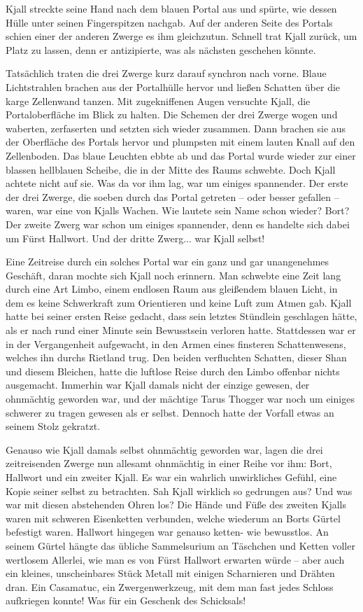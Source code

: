 \documentclass[10pt, a4paper, oneside]{book}
\begin{document}
Kjall streckte seine Hand nach dem blauen Portal aus und spürte, wie dessen Hülle unter seinen Fingerspitzen nachgab. Auf der anderen Seite des Portals schien einer der anderen Zwerge es ihm gleichzutun. Schnell trat Kjall zurück, um Platz zu lassen, denn er antizipierte, was als nächsten geschehen könnte.

Tatsächlich traten die drei Zwerge kurz darauf synchron nach vorne. Blaue Lichtstrahlen brachen aus der Portalhülle hervor und ließen Schatten über die karge Zellenwand tanzen. Mit zugekniffenen Augen versuchte Kjall, die Portaloberfläche im Blick zu halten. Die Schemen der drei Zwerge wogen und waberten, zerfaserten und setzten sich wieder zusammen. Dann brachen sie aus der Oberfläche des Portals hervor und plumpsten mit einem lauten Knall auf den Zellenboden. Das blaue Leuchten ebbte ab und das Portal wurde wieder zur einer blassen hellblauen Scheibe, die in der Mitte des Raums schwebte. Doch Kjall achtete nicht auf sie. Was da vor ihm lag, war um einiges spannender. Der erste der drei Zwerge, die soeben durch das Portal getreten – oder besser gefallen – waren, war eine von Kjalls Wachen. Wie lautete sein Name schon wieder? Bort? Der zweite Zwerg war schon um einiges spannender, denn es handelte sich dabei um Fürst Hallwort. Und der dritte Zwerg... war Kjall selbst!\bigskip



Eine Zeitreise durch ein solches Portal war ein ganz und gar unangenehmes Geschäft, daran mochte sich Kjall noch erinnern. Man schwebte eine Zeit lang durch eine Art Limbo, einem endlosen Raum aus gleißendem blauen Licht, in dem es keine Schwerkraft zum Orientieren und keine Luft zum Atmen gab. Kjall hatte bei seiner ersten Reise gedacht, dass sein letztes Stündlein geschlagen hätte, als er nach rund einer Minute sein Bewusstsein verloren hatte. Stattdessen war er in der Vergangenheit aufgewacht, in den Armen eines finsteren Schattenwesens, welches ihn durchs Rietland trug. Den beiden verfluchten Schatten, dieser Shan und diesem Bleichen, hatte die luftlose Reise durch den Limbo offenbar nichts ausgemacht. Immerhin war Kjall damals nicht der einzige gewesen, der ohnmächtig geworden war, und der mächtige Tarus Thogger war noch um einiges schwerer zu tragen gewesen als er selbst. Dennoch hatte der Vorfall etwas an seinem Stolz gekratzt.

Genauso wie Kjall damals selbst ohnmächtig geworden war, lagen die drei zeitreisenden Zwerge nun allesamt ohnmächtig in einer Reihe vor ihm: Bort, Hallwort und ein zweiter Kjall. Es war ein wahrlich unwirkliches Gefühl, eine Kopie seiner selbst zu betrachten. Sah Kjall wirklich so gedrungen aus? Und was war mit diesen abstehenden Ohren los? Die Hände und Füße des zweiten Kjalls waren mit schweren Eisenketten verbunden, welche wiederum an Borts Gürtel befestigt waren. Hallwort hingegen war genauso ketten- wie bewusstlos. An seinem Gürtel hängte das übliche Sammelsurium an Täschchen und Ketten voller wertlosem Allerlei, wie man es von Fürst Hallwort erwarten würde – aber auch ein kleines, unscheinbares Stück Metall mit einigen Scharnieren und Drähten dran. Ein Casamatuc, ein Zwergenwerkzeug, mit dem man fast jedes Schloss aufkriegen konnte! Was für ein Geschenk des Schicksals!
\end{document}
